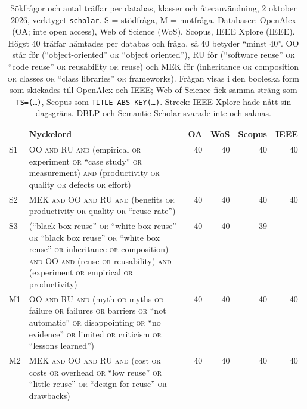 \begin{table}[!b]
  \centering
  \caption{Sökfrågor och antal träffar per databas, klasser och
    återanvändning, 2 oktober 2026, verktyget \texttt{scholar}.
    S = stödfråga, M = motfråga.  Databaser: OpenAlex (OA; inte
    \foreignlanguage{english}{open access}), Web of Science (WoS),
    Scopus, IEEE Xplore (IEEE).  Högst 40 träffar hämtades per databas
    och fråga, så 40 betyder \enquote{minst 40}.  OO står för
    (\enquote{object-oriented} \textsc{or} \enquote{object oriented}),
    RU för (\enquote{software reuse} \textsc{or} \enquote{code reuse}
    \textsc{or} reusability \textsc{or} reuse) och MEK för (inheritance
    \textsc{or} composition \textsc{or} classes \textsc{or} \enquote{class
    libraries} \textsc{or} frameworks).  Frågan visas i den booleska
    form som skickades till OpenAlex och IEEE; Web of Science fick samma
    sträng som \texttt{TS=(\dots)}, Scopus som
    \texttt{TITLE-ABS-KEY(\dots)}.  Streck: IEEE Xplore hade nått sin
    dagsgräns.  DBLP och Semantic Scholar svarade inte och saknas.}
  \label{tab:sok-queries-ateranvandning}
  \footnotesize
  \begin{tabular}{@{}lp{0.58\linewidth}rrrr@{}}
    \toprule
    & Nyckelord & OA & WoS & Scopus & IEEE \\
    \midrule
    S1 & OO \textsc{and} RU \textsc{and} (empirical \textsc{or} experiment \textsc{or} \enquote{case study} \textsc{or} measurement) \textsc{and} (productivity \textsc{or} quality \textsc{or} defects \textsc{or} effort)
       & 40 & 40 & 40 & 40 \\
    S2 & MEK \textsc{and} OO \textsc{and} RU \textsc{and} (benefits \textsc{or} productivity \textsc{or} quality \textsc{or} \enquote{reuse rate})
       & 40 & 40 & 40 & 40 \\
    S3 & (\enquote{black-box reuse} \textsc{or} \enquote{white-box reuse} \textsc{or} \enquote{black box reuse} \textsc{or} \enquote{white box reuse} \textsc{or} inheritance \textsc{or} composition) \textsc{and} OO \textsc{and} (reuse \textsc{or} reusability) \textsc{and} (experiment \textsc{or} empirical \textsc{or} productivity)
       & 40 & 40 & 39 & -- \\
    \midrule
    M1 & OO \textsc{and} RU \textsc{and} (myth \textsc{or} myths \textsc{or} failure \textsc{or} failures \textsc{or} barriers \textsc{or} \enquote{not automatic} \textsc{or} disappointing \textsc{or} \enquote{no evidence} \textsc{or} limited \textsc{or} criticism \textsc{or} \enquote{lessons learned})
       & 40 & 40 & 40 & 40 \\
    M2 & MEK \textsc{and} OO \textsc{and} RU \textsc{and} (cost \textsc{or} costs \textsc{or} overhead \textsc{or} \enquote{low reuse} \textsc{or} \enquote{little reuse} \textsc{or} \enquote{design for reuse} \textsc{or} drawbacks)
       & 40 & 40 & 40 & 40 \\
    \bottomrule
  \end{tabular}
\end{table}

